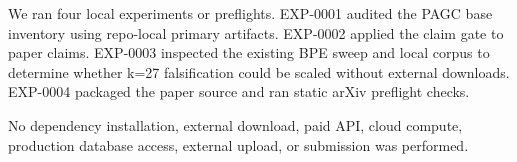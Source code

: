 We ran four local experiments or preflights. EXP-0001 audited the PAGC base inventory using repo-local primary artifacts. EXP-0002 applied the claim gate to paper claims. EXP-0003 inspected the existing BPE sweep and local corpus to determine whether k=27 falsification could be scaled without external downloads. EXP-0004 packaged the paper source and ran static arXiv preflight checks.

No dependency installation, external download, paid API, cloud compute, production database access, external upload, or submission was performed.
